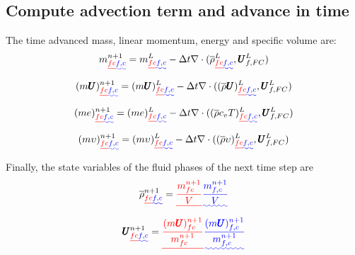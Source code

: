 \documentclass[preprint,12pt]{elsarticle}
\providecommand{\DIFadd}[1]{{\protect\color{blue}\uwave{#1}}} %
\providecommand{\DIFdel}[1]{{\protect\color{red}\sout{#1}}}                      %
\providecommand{\DIFaddbegin}{} %
\providecommand{\DIFaddend}{} %
\providecommand{\DIFdelbegin}{} %
\providecommand{\DIFdelend}{} %
\newcommand{\DIFscaledelfig}{0.5}
\newlength{\DIFdelgraphicswidth} %
\newlength{\DIFdelgraphicsheight} %
\newcommand{\DIFaddincludegraphics}[2][]{{\color{blue}\fbox{\DIFOincludegraphics[#1]{#2}}}} %
\newcommand{\DIFdelincludegraphics}[2][]{%
\sbox{\DIFdelgraphicsbox}{\DIFOincludegraphics[#1]{#2}}%
\settoboxwidth{\DIFdelgraphicswidth}{\DIFdelgraphicsbox} %
\settoboxtotalheight{\DIFdelgraphicsheight}{\DIFdelgraphicsbox} %
\scalebox{\DIFscaledelfig}{%
\parbox[b]{\DIFdelgraphicswidth}{\usebox{\DIFdelgraphicsbox}\\[-\baselineskip] \rule{\DIFdelgraphicswidth}{0em}}\llap{\resizebox{\DIFdelgraphicswidth}{\DIFdelgraphicsheight}{%
\setlength{\unitlength}{\DIFdelgraphicswidth}%
\begin{picture}(1,1)%
\thicklines\linethickness{2pt} %
{\color[rgb]{1,0,0}\put(0,0){\framebox(1,1){}}}%
{\color[rgb]{1,0,0}\put(0,0){\line( 1,1){1}}}%
{\color[rgb]{1,0,0}\put(0,1){\line(1,-1){1}}}%
\end{picture}%
}\hspace*{3pt}}} %
} %
\DeclareRobustCommand{\DIFaddbegin}{\DIFOaddbegin \let\includegraphics\DIFaddincludegraphics} %
\DeclareRobustCommand{\DIFaddend}{\DIFOaddend \let\includegraphics\DIFOincludegraphics} %
\DeclareRobustCommand{\DIFdelbegin}{\DIFOdelbegin \let\includegraphics\DIFdelincludegraphics} %
\DeclareRobustCommand{\DIFdelend}{\DIFOaddend \let\includegraphics\DIFOincludegraphics} %
\begin{document}
\subsection{\textsf{Compute advection term and advance in time}}
The time advanced mass, linear momentum, energy and specific volume are:
%
%
\begin{equation}
 m_{\DIFdelbegin \DIFdel{fc}\DIFdelend \DIFaddbegin \DIFadd{f,c}\DIFaddend }^{n+1} = m_{\DIFdelbegin \DIFdel{fc}\DIFdelend \DIFaddbegin \DIFadd{f,c}\DIFaddend }^L - \delt  \nabla \cdot (\overline{\rho}_{\DIFdelbegin \DIFdel{fc}\DIFdelend \DIFaddbegin \DIFadd{f,c}\DIFaddend }^L,\pmb{U}_{f,FC}^{L})
\end {equation}
%
%
\begin{equation}
 (m \pmb{U})_{\DIFdelbegin \DIFdel{fc}\DIFdelend \DIFaddbegin \DIFadd{f,c}\DIFaddend }^{n+1} = (m \pmb{U})_{\DIFdelbegin \DIFdel{fc}\DIFdelend \DIFaddbegin \DIFadd{f,c}\DIFaddend }^L - \delt  \nabla \cdot ((\overline{\rho} \pmb{U})_{\DIFdelbegin \DIFdel{fc}\DIFdelend \DIFaddbegin \DIFadd{f,c}\DIFaddend }^L,\pmb{U}_{f,FC}^{L})
\end {equation}
%
%
\begin{equation}
 (me)_{\DIFdelbegin \DIFdel{fc}\DIFdelend \DIFaddbegin \DIFadd{f,c}\DIFaddend }^{n+1} = (me)_{\DIFdelbegin \DIFdel{fc}\DIFdelend \DIFaddbegin \DIFadd{f,c}\DIFaddend }^L - \delt  \nabla \cdot ((\overline{\rho} c_v T)_{\DIFdelbegin \DIFdel{fc}\DIFdelend \DIFaddbegin \DIFadd{f,c}\DIFaddend }^L,\pmb{U}_{f,FC}^{L})
\end {equation}
%
%
\begin{equation}
 (m \upsilon)_{\DIFdelbegin \DIFdel{fc}\DIFdelend \DIFaddbegin \DIFadd{f,c}\DIFaddend }^{n+1} = (m \upsilon)_{\DIFdelbegin \DIFdel{fc}\DIFdelend \DIFaddbegin \DIFadd{f,c}\DIFaddend }^L - \delt  \nabla \cdot ((\overline{\rho} \upsilon)_{\DIFdelbegin \DIFdel{fc}\DIFdelend \DIFaddbegin \DIFadd{f,c}\DIFaddend }^L,\pmb{U}_{f,FC}^{L})
\end {equation}
%
%
Finally, the state variables of the fluid phases of the next time step are\DIFaddbegin \DIFadd{:
}\DIFaddend %
%
\begin{equation}
\overline{\rho}_{\DIFdelbegin \DIFdel{fc}\DIFdelend \DIFaddbegin \DIFadd{f,c}\DIFaddend }^{n+1} = \DIFdelbegin \DIFdel{\frac{m_{fc}^{n+1}}{V}
}\DIFdelend \DIFaddbegin \DIFadd{\frac{m_{f,c}^{n+1}}{V}
}\DIFaddend \end {equation}
%
%
\begin{equation}
 \pmb{U}_{\DIFdelbegin \DIFdel{fc}\DIFdelend \DIFaddbegin \DIFadd{f,c}\DIFaddend }^{n+1} = \DIFdelbegin \DIFdel{\frac{(m \pmb{U})_{fc}^{n+1}}{m_{fc}^{n+1}} 
}\DIFdelend \DIFaddbegin \DIFadd{\frac{(m \pmb{U})_{f,c}^{n+1}}{m_{f,c}^{n+1}} 
}\DIFaddend \end {equation}
\end{document}
